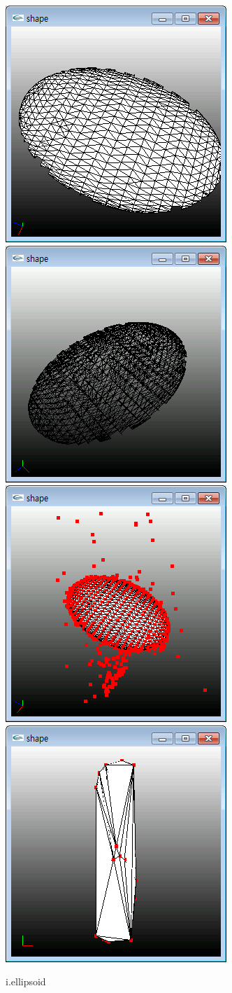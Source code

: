\documentclass[11pt]{article}
\begin{document}
\begin{figure}[ht]
\centering
\includegraphics[width=.23\textwidth]{FIGS/ellipsoid1}
\hspace{0.2cm}
\includegraphics[width=.23\textwidth]{FIGS/ellipsoid2}
\hspace{0.2cm}
\includegraphics[width=.23\textwidth]{FIGS/ellipsoid3}
\hspace{0.2cm}
\includegraphics[width=.23\textwidth]{FIGS/ellipsoid4}
\caption{i.ellipsoid}
\end{figure}
\end{document}
